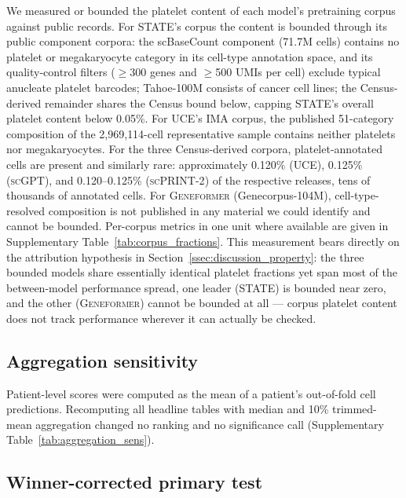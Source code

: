 \documentclass[11pt,a4paper]{article}
\newcommand{\model}[1]{\textsc{#1}}
\begin{document}
We measured or bounded the platelet content of each model's pretraining
corpus against public records. For \model{STATE}'s corpus the content is
bounded through its public component corpora: the scBaseCount component
(71.7M cells) contains no platelet or megakaryocyte category in its
cell-type annotation space, and its quality-control filters ($\geq$300 genes
and $\geq$500 UMIs per cell) exclude typical anucleate platelet barcodes;
Tahoe-100M consists of cancer cell lines; the Census-derived remainder
shares the Census bound below, capping \model{STATE}'s overall platelet
content below 0.05\%. For \model{UCE}'s IMA corpus, the published
51-category composition of the 2{,}969{,}114-cell representative sample
contains neither platelets nor megakaryocytes. For the three Census-derived
corpora, platelet-annotated cells are present and similarly rare:
approximately 0.120\% (\model{UCE}), 0.125\% (\model{scGPT}), and
0.120--0.125\% (\model{scPRINT-2}) of the respective releases, tens of
thousands of annotated cells. For \model{Geneformer} (Genecorpus-104M),
cell-type-resolved composition is not published in any material we could
identify and cannot be bounded. Per-corpus metrics in one unit where
available are given in Supplementary Table~\ref{tab:corpus_fractions}. This
measurement bears directly on the attribution hypothesis in
Section~\ref{ssec:discussion_property}: the three bounded models share
essentially identical platelet fractions yet span most of the between-model
performance spread, one leader (\model{STATE}) is bounded near zero, and the
other (\model{Geneformer}) cannot be bounded at all --- corpus platelet
content does not track performance wherever it can actually be checked.

\subsection{Aggregation sensitivity}
\label{sn:aggregation}

Patient-level scores were computed as the mean of a patient's out-of-fold cell
predictions. Recomputing all headline tables with median and 10\% trimmed-mean
aggregation changed no ranking and no significance call
(Supplementary Table~\ref{tab:aggregation_sens}).

\subsection{Winner-corrected primary test}
\label{sn:winner_test}
\end{document}
